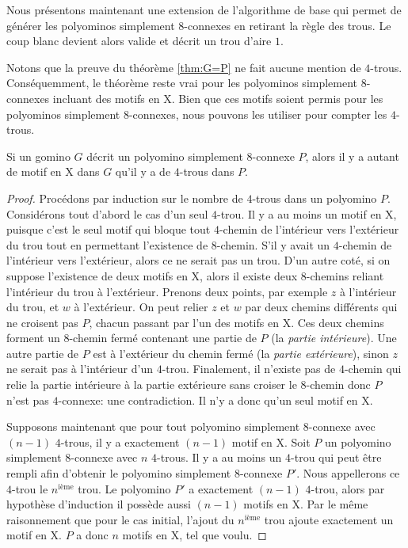 \vspace{-0.5em}
Nous présentons maintenant une extension de l'algorithme de base qui permet de générer les polyominos simplement $8$-connexes en retirant la règle des trous. Le coup blanc  devient alors valide et décrit un trou d'aire $1$.

Notons que la preuve du théorème \ref{thm:G=P} ne fait aucune mention de $4$-trous. Conséquemment, le théorème reste vrai pour les polyominos simplement $8$-connexes incluant des motifs en X. Bien que ces motifs soient permis pour les polyominos simplement $8$-connexes, nous pouvons les utiliser pour compter les $4$-trous.

\begin{proposition}
Si un gomino $G$ décrit un polyomino simplement $8$-connexe $P$, alors il y a autant de motif en X dans $G$ qu'il y a de $4$-trous dans $P$.
\end{proposition}

\vspace{-0.5em}
\begin{proof}
Procédons par induction sur le nombre de $4$-trous dans un polyomino $P$.
Considérons tout d'abord le cas d'un seul $4$-trou. Il y a au moins un motif en X, puisque c'est le seul motif qui bloque tout $4$-chemin de l'intérieur vers l'extérieur du trou tout en permettant l'existence de $8$-chemin. S'il y avait un $4$-chemin de l'intérieur vers l'extérieur, alors ce ne serait pas un trou. D'un autre coté, si on suppose l'existence de deux motifs en X, alors il existe deux $8$-chemins reliant l'intérieur du trou à l'extérieur. Prenons deux points, par exemple $z$ à l'intérieur du trou, et $w$ à l'extérieur. On peut relier $z$ et $w$ par deux chemins différents qui ne croisent pas $P$, chacun passant par l'un des motifs en X. Ces deux chemins forment un $8$-chemin fermé contenant une partie de $P$ (la \emph{partie intérieure}). Une autre partie de $P$ est à l'extérieur du chemin fermé (la \emph{partie extérieure}), sinon $z$ ne serait pas à l'intérieur d'un $4$-trou. Finalement, il n'existe pas de $4$-chemin qui relie la partie intérieure à la partie extérieure sans croiser le $8$-chemin donc $P$ n'est pas $4$-connexe: une contradiction. Il n'y a donc qu'un seul motif en X.

Supposons maintenant que pour tout polyomino simplement $8$-connexe avec $(n-1)$ $4$-trous, il y a exactement $(n-1)$ motif en X. Soit $P$ un polyomino simplement $8$-connexe avec $n$ $4$-trous. Il y a au moins un $4$-trou qui peut être rempli afin d'obtenir le polyomino simplement $8$-connexe $P'$. Nous appellerons ce $4$-trou le $n^{\text{ième}}$ trou. Le polyomino $P'$ a exactement $(n-1)$ $4$-trou, alors par hypothèse d'induction il possède aussi $(n-1)$ motifs en X. Par le même raisonnement que pour le cas initial, l'ajout du $n^{\text{ième}}$ trou ajoute exactement un motif en X. $P$ a donc $n$ motifs en X, tel que voulu.
\end{proof}



